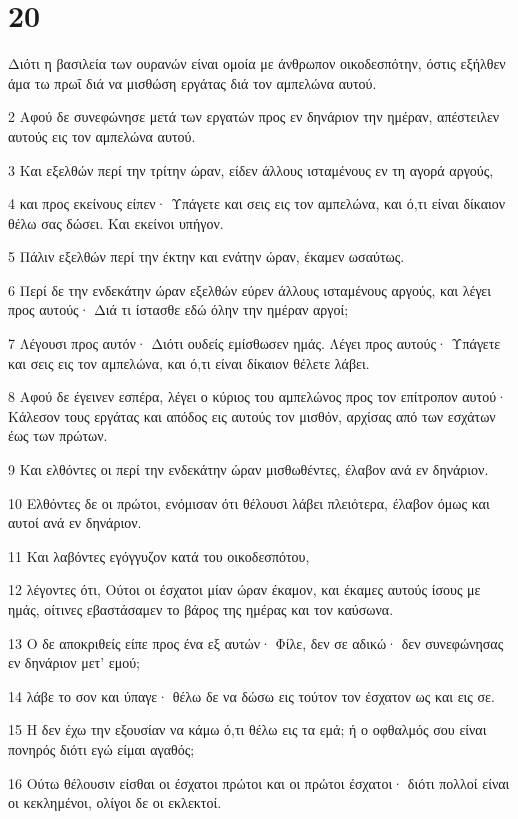 \chapter{20}

\par Διότι η βασιλεία των ουρανών είναι ομοία με άνθρωπον οικοδεσπότην, όστις εξήλθεν άμα τω πρωΐ διά να μισθώση εργάτας διά τον αμπελώνα αυτού.
\par 2 Αφού δε συνεφώνησε μετά των εργατών προς εν δηνάριον την ημέραν, απέστειλεν αυτούς εις τον αμπελώνα αυτού.
\par 3 Και εξελθών περί την τρίτην ώραν, είδεν άλλους ισταμένους εν τη αγορά αργούς,
\par 4 και προς εκείνους είπεν· Υπάγετε και σεις εις τον αμπελώνα, και ό,τι είναι δίκαιον θέλω σας δώσει. Και εκείνοι υπήγον.
\par 5 Πάλιν εξελθών περί την έκτην και ενάτην ώραν, έκαμεν ωσαύτως.
\par 6 Περί δε την ενδεκάτην ώραν εξελθών εύρεν άλλους ισταμένους αργούς, και λέγει προς αυτούς· Διά τι ίστασθε εδώ όλην την ημέραν αργοί;
\par 7 Λέγουσι προς αυτόν· Διότι ουδείς εμίσθωσεν ημάς. Λέγει προς αυτούς· Υπάγετε και σεις εις τον αμπελώνα, και ό,τι είναι δίκαιον θέλετε λάβει.
\par 8 Αφού δε έγεινεν εσπέρα, λέγει ο κύριος του αμπελώνος προς τον επίτροπον αυτού· Κάλεσον τους εργάτας και απόδος εις αυτούς τον μισθόν, αρχίσας από των εσχάτων έως των πρώτων.
\par 9 Και ελθόντες οι περί την ενδεκάτην ώραν μισθωθέντες, έλαβον ανά εν δηνάριον.
\par 10 Ελθόντες δε οι πρώτοι, ενόμισαν ότι θέλουσι λάβει πλειότερα, έλαβον όμως και αυτοί ανά εν δηνάριον.
\par 11 Και λαβόντες εγόγγυζον κατά του οικοδεσπότου,
\par 12 λέγοντες ότι, Ούτοι οι έσχατοι μίαν ώραν έκαμον, και έκαμες αυτούς ίσους με ημάς, οίτινες εβαστάσαμεν το βάρος της ημέρας και τον καύσωνα.
\par 13 Ο δε αποκριθείς είπε προς ένα εξ αυτών· Φίλε, δεν σε αδικώ· δεν συνεφώνησας εν δηνάριον μετ' εμού;
\par 14 λάβε το σον και ύπαγε· θέλω δε να δώσω εις τούτον τον έσχατον ως και εις σε.
\par 15 Η δεν έχω την εξουσίαν να κάμω ό,τι θέλω εις τα εμά; ή ο οφθαλμός σου είναι πονηρός διότι εγώ είμαι αγαθός;
\par 16 Ούτω θέλουσιν είσθαι οι έσχατοι πρώτοι και οι πρώτοι έσχατοι· διότι πολλοί είναι οι κεκλημένοι, ολίγοι δε οι εκλεκτοί.
